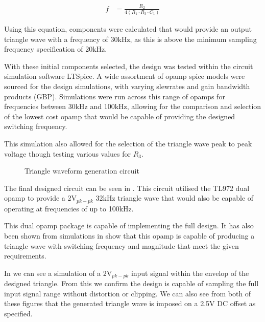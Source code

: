 \documentclass[a4paper,11pt]{article}
\begin{document}
\begin{align*}
    f &= \frac{R_2}{4(R_1 \cdot R_3 \cdot C_1)} 
\end{align*}

Using this equation, components were calculated that would provide an output triangle wave with a frequency of 30kHz, as this is above the minimum sampling frequency specification of 20kHz. 

With these initial components selected, the design was tested within the circuit simulation software LTSpice. A wide assortment of opamp spice models were sourced for the design simulations, with varying slewrates and gain bandwidth products (GBP). Simulations were run across this range of opamps for frequencies between 30kHz and 100kHz, allowing for the comparison and selection of the lowest cost opamp that would be capable of providing the designed switching frequency. 

This simulation also allowed for the selection of the triangle wave peak to peak voltage though testing various values for $R_3$. 


\begin{figure}[h!]
    \centering
    \caption{Triangle waveform generation circuit}
    \label{F:spice_circuit}
\end{figure}

 The final designed circuit can be seen in . This circuit utilised the TL972 dual opamp to provide a 2V$_{pk-pk}$ 32kHz triangle wave that would also be capable of operating at frequencies of up to 100kHz. 
 
 This dual opamp package is capable of implementing the full design. It has also been shown from simulations in  show that this opamp is capable of producing a triangle wave with switching frequency and magnitude that meet the given requirements.

 In  we can see a simulation of a 2V$_{pk-pk}$ input signal within the envelop of the designed triangle. From this we confirm the design is capable of sampling the full input signal range without distortion or clipping. We can also see from both of these figures that the generated triangle wave is imposed on a 2.5V DC offset as specified. 
\end{document}
